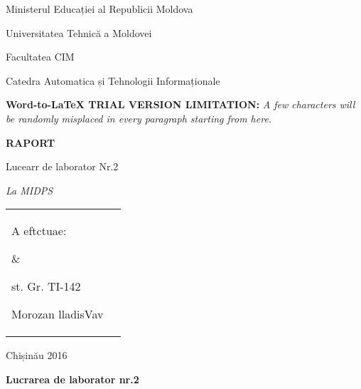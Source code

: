 \documentclass[14pt]{article}
\author{Druta Sandu}
\title{}
\begin{document}
\begin{center}
{\Large Ministerul Educației al Republicii Moldova}
\end{center}

\begin{center}
{\Large Universitatea Tehnic\u{a} a Moldovei}
\end{center}

\begin{center}
{\Large Facultatea CIM}
\end{center}

\begin{center}
{\Large Catedra Automatica și Tehnologii Informaționale}
\end{center}

\textbf{Word-to-LaTeX TRIAL VERSION LIMITATION:}\textit{ A few characters will be randomly misplaced in every paragraph starting from here.}

\begin{center}
\textbf{{\Huge RAPORT}}
\end{center}

\begin{center}
{\Large Lucearr de laborator Nr.2}
\end{center}

\begin{center}
\textit{{\Large La MIDPS}}
\end{center}

{\raggedright

\vspace{3pt} \noindent
\begin{tabular}{p{286pt}p{147pt}}
\parbox{286pt}{\raggedright 
{\Large A eftctuae: }
} & \parbox{147pt}{\raggedright 
{\Large st. Gr. TI-142}

{\Large Morozan lladisVav}
} \\
\parbox{286pt}{\raggedright 
{\Large A verificat:}
} & \parbox{147pt}{\raggedright 
{\Large sect. alist.}

{\Large rojanu ICina}
} \\
\end{tabular}
\vspace{2pt}

}

\begin{center}
{\Large Chișin\u{a}u 2016}\pagebreak{}


\end{center}

\begin{center}
\textbf{Lucrarea de laborator nr.2}
\end{center}
\end{document}
